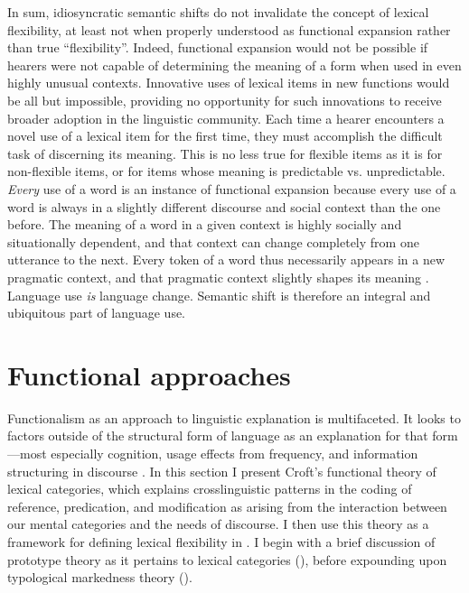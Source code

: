In sum, idiosyncratic semantic shifts do not invalidate the concept of lexical flexibility, at least not when properly understood as functional expansion rather than true \enquote{flexibility}. Indeed, functional expansion would not be possible if hearers were not capable of determining the meaning of a form when used in even highly unusual contexts. Innovative uses of lexical items in new functions would be all but impossible, providing no opportunity for such innovations to receive broader adoption in the linguistic community. Each time a hearer encounters a novel use of a lexical item for the first time, they must accomplish the difficult task of discerning its meaning. This is no less true for flexible items as it is for non-flexible items, or for items whose meaning is predictable vs. unpredictable. \emph{Every} use of a word is an instance of functional expansion because every use of a word is always in a slightly different discourse and social context than the one before. The meaning of a word in a given context is highly socially and situationally dependent, and that context can change completely from one utterance to the next. Every token of a word thus necessarily appears in a new pragmatic context, and that pragmatic context slightly shapes its meaning \parencite[99--105]{Croft2010}. Language use \emph{is} language change. Semantic shift is therefore an integral and ubiquitous part of language use.

\section{Functional approaches}
\label{sec:2.4}

Functionalism as an approach to linguistic explanation is multifaceted. It looks to factors outside of the structural form of language as an explanation for that form—most especially cognition, usage effects from frequency, and information structuring in discourse \parencite[6323--6324]{Croft2001a}. In this section I present Croft's \parencites*{Croft1991}{Croft2000}{Croft2001b} functional theory of lexical categories, which explains crosslinguistic patterns in the coding of reference, predication, and modification as arising from the interaction between our mental categories and the needs of discourse. I then use this theory as a framework for defining lexical flexibility in . I begin with a brief discussion of prototype theory as it pertains to lexical categories (), before expounding upon typological markedness theory ().

